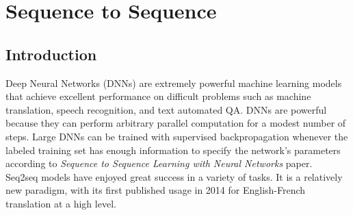 \section{Sequence to Sequence}
\label{chap:Sequence to Sequence}

\subsection{Introduction}
Deep Neural Networks (DNNs) are extremely powerful machine learning models that achieve excellent performance on difficult problems such as machine translation, speech recognition, and text automated QA. DNNs are powerful because they can perform arbitrary parallel computation
for a modest number of steps. Large
DNNs can be trained with supervised backpropagation whenever the labeled training set has enough information to specify the network’s parameters according to \textit{Sequence to Sequence Learning
with Neural Networks} paper. \cite{web015}\\
Seq2seq models have enjoyed great success in a variety of tasks.
It is a relatively new paradigm,
with its first published usage in 2014 for English-French translation at a high level.
